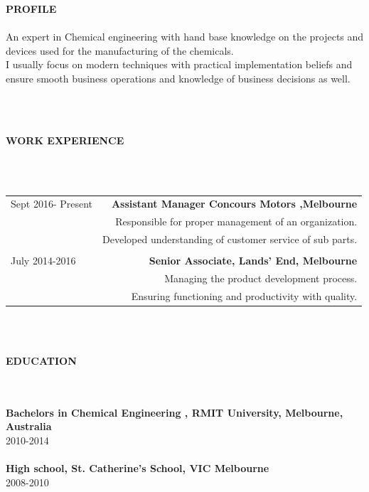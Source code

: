 \documentclass[10pt]{article}
\begin{document}
    \begin{large}  
    \textbf{PROFILE} \\ \\ %
    An expert in Chemical engineering with hand base knowledge on the projects and devices used for the manufacturing of the chemicals.\\I usually focus on modern techniques with practical implementation beliefs and  
    ensure smooth business operations and knowledge of business decisions as well.  
    \end{large}\\ \\  
      
    \begin{large}  
    \textbf{WORK EXPERIENCE}  
    \end{large}\\ \\  
    \begin{tabular}{lr}  
    Sept 2016- Present & \textbf{Assistant Manager Concours Motors ,Melbourne} \\  
    & Responsible for proper management of an organization.\\  
     & Developed understanding of customer service of sub parts.\\ \\  
    July 2014-2016& \textbf{Senior Associate, Lands' End, Melbourne}\\  
     & Managing the product development process.\\  
     & Ensuring functioning and productivity with quality.\\  
    \end{tabular} \\ \\   
      
    \begin{large}  
    \textbf{EDUCATION}  
    \end{large}\\ \\  
    \textbf{Bachelors in Chemical Engineering , RMIT University, Melbourne, Australia}\\  
    2010-2014\\ \\ %
    \textbf{High school, St. Catherine's School, VIC Melbourne}\\  
    2008-2010 \\ \\  
      
\end{document}
